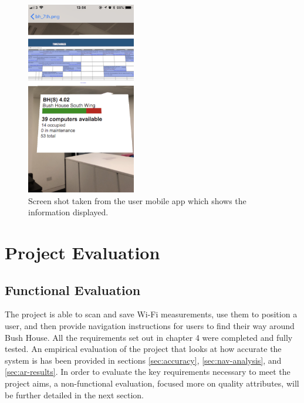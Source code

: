 \begin{figure}[H]
    \centering
    \includegraphics[width=180px, height=320px]{Evaluation/AR-Info.png}
    \caption{Screen shot taken from the user mobile app which shows the information displayed.}
    \label{fig:ar-info}
\end{figure}

\section{Project Evaluation}

\subsection{Functional Evaluation}
The project is able to scan and save Wi-Fi measurements, use them to position a user, and then provide navigation instructions for users to find their way around Bush House. All the requirements set out in chapter 4 were completed and fully tested. An empirical evaluation of the project that looks at how accurate the system is has been provided in sections \ref{sec:accuracy}, \ref{sec:nav-analysis}, and \ref{sec:ar-results}. In order to evaluate the key requirements necessary to meet the project aims, a non-functional evaluation, focused more on quality attributes, will be further detailed in the next section.

